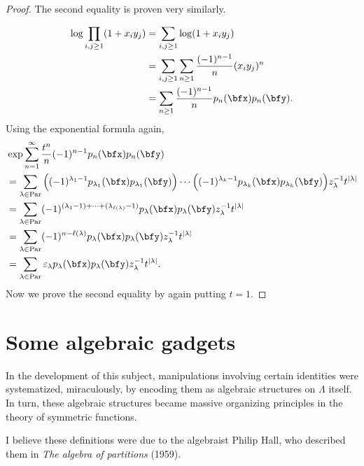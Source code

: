 \documentclass{article}
\DeclareMathOperator{\Par}{Par}
\begin{document}
\begin{proof}
    The second equality is proven very similarly.

    \begin{align*}
        \log \prod_{i,j \geq 1}
        (1+x_iy_j)
        &=
        \sum_{i,j\geq1}
        \log(1+x_iy_j) \\
        &=
        \sum_{i,j \geq 1}
        \sum_{n\geq 1}
        \frac{(-1)^{n-1}}{n}(x_iy_j)^n \\
        &=
        \sum_{n \geq 1}
        \frac{(-1)^{n-1}}{n} p_n(\bfx) p_n(\bfy).
    \end{align*}
    Using the exponential formula again,
    \begin{align*}
        &\exp
        \sum_{n=1}^\infty
        \frac{t^n}{n}
        (-1)^{n-1}
        p_n(\bfx) p_n(\bfy)
        \\
        &=
        \sum_{\lambda \in \Par}
        \Big(
            (-1)^{\lambda_1-1}
            p_{\lambda_1}(\bfx) p_{\lambda_1}(\bfy)
        \Big)
        \cdots
        \Big(
            (-1)^{\lambda_k-1}
            p_{\lambda_k}(\bfx) p_{\lambda_k}(\bfy)
        \Big)
        z_\lambda^{-1}
        t^{|\lambda|} \\
        &=
        \sum_{\lambda \in \Par}
        (-1)^{(\lambda_1 - 1) + \cdots + (\lambda_{\ell(\lambda)} - 1)}
        p_\lambda(\bfx) p_\lambda(\bfy) z_\lambda^{-1}
        t^{|\lambda|} \\
        &=
        \sum_{\lambda \in \Par}
        (-1)^{n - \ell(\lambda)}
        p_\lambda(\bfx) p_\lambda(\bfy) z_\lambda^{-1}
        t^{|\lambda|} \\
        &=
        \sum_{\lambda \in \Par}
        \varepsilon_\lambda
        p_\lambda(\bfx) p_\lambda(\bfy) z_\lambda^{-1}
        t^{|\lambda|}.
    \end{align*}
    Now we prove the second equality by again putting $t=1$.
\end{proof}

\section{Some algebraic gadgets}

In the development of this subject, manipulations involving certain identities were systematized, miraculously, by encoding them as algebraic structures on $\Lambda$ itself.
In turn, these algebraic structures became massive organizing principles in the theory of symmetric functions.

I believe these definitions were due to the algebraist Philip Hall, who described them in \textit{The algebra of partitions} (1959).
\end{document}
